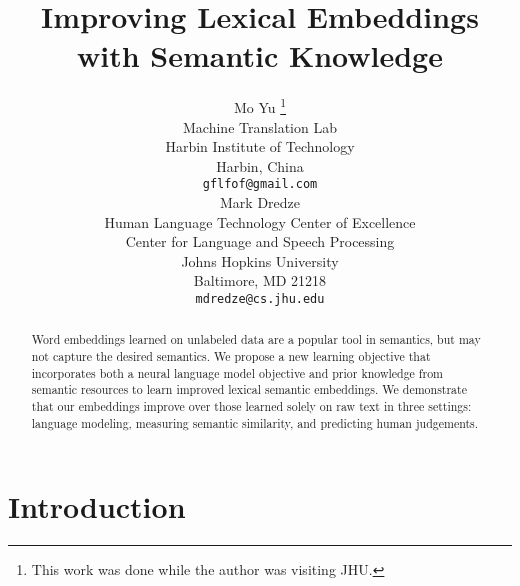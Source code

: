 \documentclass[11pt]{article}
\begin{document}
\title{Improving Lexical Embeddings with Semantic Knowledge}

\author{Mo Yu \thanks{This work was done while the author was visiting JHU.} \\
  Machine Translation Lab \\
  Harbin Institute of Technology \\
  Harbin, China  \\
  {\tt gflfof@gmail.com} \\\And
  Mark Dredze \\
  Human Language Technology Center of Excellence \\
  Center for Language and Speech Processing \\
  Johns Hopkins University \\
  Baltimore, MD 21218 \\
  {\tt mdredze@cs.jhu.edu} \\}

\date{}
\maketitle

\begin{abstract}

Word embeddings learned on unlabeled data are a popular tool in semantics, but may not 
capture the desired semantics.
We propose a new learning objective that incorporates both a neural language model objective \cite{mikolov2013distributed}
and prior knowledge from semantic resources to learn improved lexical semantic embeddings.
We demonstrate that our embeddings improve over those learned solely on raw text in three settings:
language modeling, measuring semantic similarity, and predicting human judgements.
\end{abstract}

\section{Introduction}
\label{sec:intro}
\end{document}
